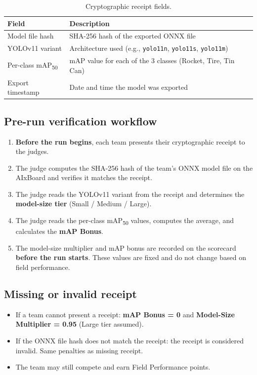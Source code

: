 \documentclass[a4]{article}
\begin{document}
\begin{table}[H]
\centering
\begin{tabular}{ll}
\toprule
\textbf{Field} & \textbf{Description} \\
\midrule
Model file hash & SHA-256 hash of the exported ONNX file \\
YOLOv11 variant & Architecture used (e.g., \texttt{yolo11n}, \texttt{yolo11s}, \texttt{yolo11m}) \\
Per-class mAP\textsubscript{50} & mAP value for each of the 3 classes (Rocket, Tire, Tin Can) \\
Export timestamp & Date and time the model was exported \\
\bottomrule
\end{tabular}
\caption{Cryptographic receipt fields.}
\end{table}

\subsection*{Pre-run verification workflow}

\begin{enumerate}
    \item \textbf{Before the run begins}, each team presents their cryptographic receipt to the judges.
    \item The judge computes the SHA-256 hash of the team's ONNX model file on the AIxBoard and verifies it matches the receipt.
    \item The judge reads the YOLOv11 variant from the receipt and determines the \textbf{model-size tier} (Small / Medium / Large).
    \item The judge reads the per-class mAP\textsubscript{50} values, computes the average, and calculates the \textbf{mAP Bonus}.
    \item The model-size multiplier and mAP bonus are recorded on the scorecard \textbf{before the run starts}. These values are fixed and do not change based on field performance.
\end{enumerate}

\subsection*{Missing or invalid receipt}

\begin{itemize}
    \item If a team cannot present a receipt: \textbf{mAP Bonus = 0} and \textbf{Model-Size Multiplier = 0.95} (Large tier assumed).
    \item If the ONNX file hash does not match the receipt: the receipt is considered invalid. Same penalties as missing receipt.
    \item The team may still compete and earn Field Performance points.
\end{itemize}
\end{document}
